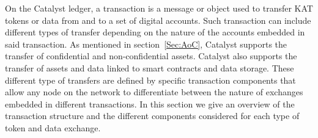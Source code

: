 On the Catalyst ledger, a transaction is a message or object used to transfer KAT tokens or data from and to a set of digital accounts. Such transaction can include different types of transfer depending on the nature of the accounts embedded in said transaction. As mentioned in section~\ref{Sec:AoC}, Catalyst supports the transfer of confidential and non-confidential assets. Catalyst also supports the transfer of assets and data linked to smart contracts and data storage. These different type of transfers are defined by specific transaction components that allow any node on the network to differentiate between the nature of exchanges embedded in different transactions. In this section we give an overview of the transaction structure and the different components considered for each type of token and data exchange.